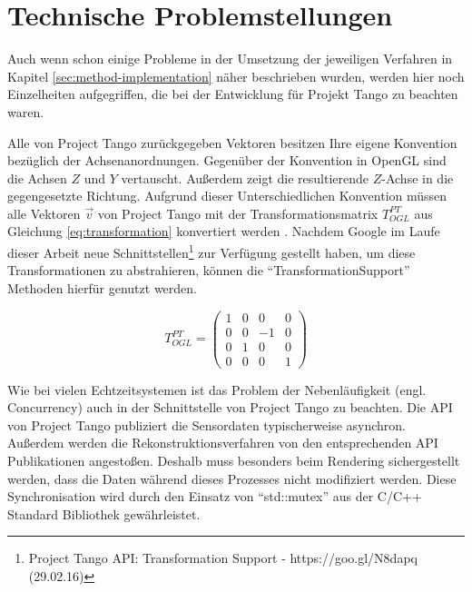 \section{Technische Problemstellungen}

Auch wenn schon einige Probleme in der Umsetzung der jeweiligen Verfahren in Kapitel \ref{sec:method-implementation} näher beschrieben wurden, werden hier noch Einzelheiten aufgegriffen, die bei der Entwicklung für Projekt Tango zu beachten waren. 

Alle von Project Tango zurückgegeben Vektoren besitzen Ihre eigene Konvention bezüglich der Achsenanordnungen. Gegenüber der Konvention in OpenGL sind die Achsen \(Z\) und \(Y\) vertauscht. Außerdem zeigt die resultierende \(Z\)-Achse in die gegengesetzte Richtung. Aufgrund dieser Unterschiedlichen Konvention müssen alle Vektoren \(\vec{v}\) von Project Tango mit der Transformationsmatrix \(T_{OGL}^{PT}\) aus Gleichung \ref{eq:transformation} konvertiert werden \citep{Proje15:online}. Nachdem Google im Laufe dieser Arbeit neue Schnittstellen\footnote{Project Tango API: Transformation Support - https://goo.gl/N8dapq (29.02.16)} zur Verfügung gestellt haben, um diese Transformationen zu abstrahieren, können die \enquote{TransformationSupport} Methoden hierfür genutzt werden.

\begin{equation} \label{eq:transformation}
T_{OGL}^{PT} =\left( \begin{matrix} 1&0&0&0\\0&0&-1&0\\0&1&0&0\\0&0&0&1 \end{matrix} \right)
\end{equation}

Wie bei vielen Echtzeitsystemen ist das Problem der Nebenläufigkeit (engl. Concurrency) auch in der Schnittstelle von Project Tango zu beachten. Die API von Project Tango publiziert die Sensordaten typischerweise asynchron. Außerdem werden die Rekonstruktionsverfahren von den entsprechenden API Publikationen angestoßen. Deshalb muss besonders beim Rendering sichergestellt werden, dass die Daten während dieses Prozesses nicht modifiziert werden. Diese Synchronisation wird durch den Einsatz von \enquote{std::mutex} aus der C/C++ Standard Bibliothek gewährleistet. 


